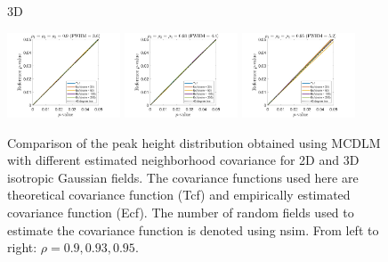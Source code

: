 \documentclass{article}
\begin{document}
\begin{figure}[!htp]
\begin{sideways}
\phantom{------------------}3D
\end{sideways}
\includegraphics[trim=80 5 80 5, clip,width=0.3\textwidth]{figure/3D_rho1_0.9_rho2_0.9.jpg}
\includegraphics[trim=80 5 80 5, clip,width=0.3\textwidth]{figure/3D_rho1_0.93_rho2_0.93.jpg}
\includegraphics[trim=80 5 80 5, clip,width=0.3\textwidth]{figure/3D_rho1_0.95_rho2_0.95.jpg}
\caption{Comparison of the peak height distribution obtained using MCDLM with different estimated neighborhood covariance for 2D and 3D isotropic Gaussian fields. The covariance functions used here are theoretical covariance function (Tcf) and empirically estimated covariance function (Ecf). The number of random fields used to estimate the covariance function is denoted using nsim. From left to right: $\rho = 0.9, 0.93, 0.95$. \label{fig.appendix.d5}}
\end{figure}

\clearpage
\end{document}
